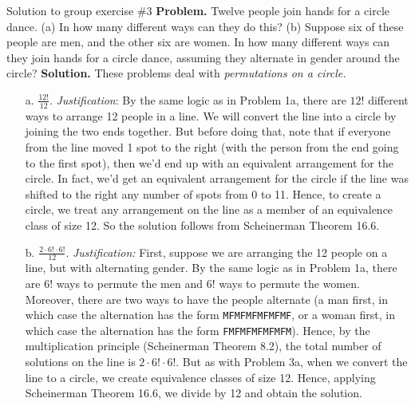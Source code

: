 \documentclass[10pt]{beamer}
\begin{document}
\begin{frame}{Solution to group exercise \#3}
\scriptsize 
\textbf{Problem.} Twelve people join hands for a circle dance. 
(a) In how many different ways can they do this? (b) Suppose six of these people are men, and the other six are women. In how many different ways can they join hands for a circle dance, assuming they alternate in gender around the circle?
\vfill 
\textbf{Solution.} These problems deal with \textit{permutations on a circle.} 

\begin{itemize}
\item[a.] $\frac{12!}{12}$. \quad  \textit{Justification}:  By the same logic as in Problem 1a, there are $12!$ different ways to arrange 12 people in a line. We will convert the line into a circle by joining the two ends together.  But before doing that, note that if everyone from the line moved 1 spot to the right (with the person from the end going to the first spot), then we'd end up with an equivalent arrangement for the circle.  In fact, we'd get an equivalent arrangement for the circle if the line was shifted to the right any number of spots from 0 to 11.   Hence, to create a circle, we treat any arrangement on the line as a member of an equivalence class of size 12.  So the solution follows from Scheinerman Theorem 16.6.
\item[b.] $\frac{2 \cdot 6! \cdot 6!}{12}$. \quad  \textit{Justification:}  First, suppose we are arranging the 12 people on a line, but with alternating gender.  By the same logic as in Problem 1a, there are 6! ways to permute the men and 6! ways to permute the women.  Moreover, there are two ways to have the people alternate (a man first, in which case the alternation has the form \texttt{MFMFMFMFMFMF}, or a woman first, in which case the alternation has the form \texttt{FMFMFMFMFMFM}).  Hence, by the multiplication principle (Scheinerman Theorem 8.2), the total number of solutions on the line is $2 \cdot 6! \cdot 6!$.   But as with Problem 3a, when we convert the line to a circle, we create equivalence classes of size 12. Hence, applying Scheinerman Theorem 16.6, we divide by 12 and obtain the solution.  
\end{itemize}


\end{frame}
\end{document}
